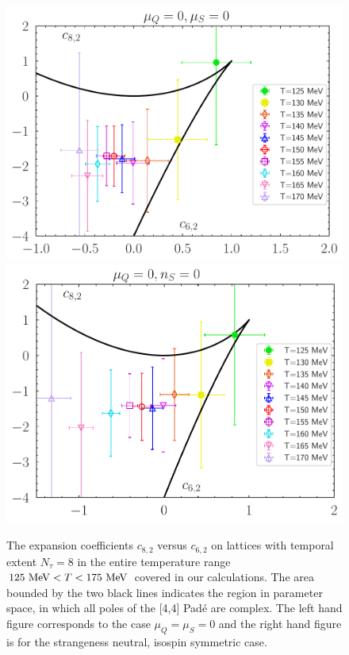 \documentclass[pdflatex,prd,twocolumn,showpacs,superscriptaddress,nofootinbib]{revtex4-1}
\begin{document}
\begin{figure}[t]
	\begin{center}
\includegraphics[scale=0.36]{fig/muB_real_poles_constraint.pdf}
\includegraphics[scale=0.36]{fig/real_poles_constraint_ispspin.pdf}
\end{center}
\caption{The expansion coefficients $c_{8,2}$ versus $c_{6,2}$ on lattices with temporal extent $N_\tau=8$
in the entire temperature range $125~{\rm MeV}< T < 175~{\rm MeV}$ covered in our calculations. The area
bounded by the two black lines indicates the region in parameter space, in which all poles of the [4,4] Pad\'e are complex. The left hand figure corresponds to the case $\mu_Q=\mu_S=0$ and the right hand figure is for the strangeness neutral, isospin symmetric case.}
\label{fig:c8c6plane}
\end{figure}	
\end{document}
